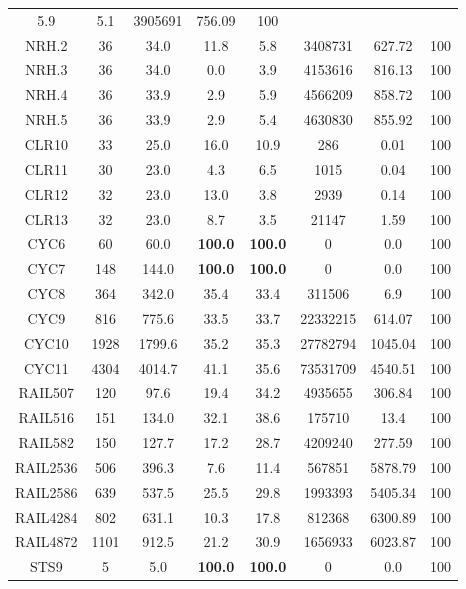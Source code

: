\begin{longtable}{@{\extracolsep{5pt}}cccccccc}
			5.9
		&
			5.1
		& 3905691 & 756.09 & 100
	\\
	NRH.2 &
		36 & 34.0 &
			11.8
		&
			5.8
		& 3408731 & 627.72 & 100
	\\
	NRH.3 &
		36 & 34.0 &
			0.0
		&
			3.9
		& 4153616 & 816.13 & 100
	\\
	NRH.4 &
		36 & 33.9 &
			2.9
		&
			5.9
		& 4566209 & 858.72 & 100
	\\
	NRH.5 &
		36 & 33.9 &
			2.9
		&
			5.4
		& 4630830 & 855.92 & 100
	\\
	CLR10 &
		33 & 25.0 &
			16.0
		&
			10.9
		& 286 & 0.01 & 100
	\\
	CLR11 &
		30 & 23.0 &
			4.3
		&
			6.5
		& 1015 & 0.04 & 100
	\\
	CLR12 &
		32 & 23.0 &
			13.0
		&
			3.8
		& 2939 & 0.14 & 100
	\\
	CLR13 &
		32 & 23.0 &
			8.7
		&
			3.5
		& 21147 & 1.59 & 100
	\\
	CYC6 &
		60 & 60.0 &
			\textbf{100.0}
		&
			\textbf{100.0}
		& 0 & 0.0 & 100
	\\
	CYC7 &
		148 & 144.0 &
			\textbf{100.0}
		&
			\textbf{100.0}
		& 0 & 0.0 & 100
	\\
	CYC8 &
		364 & 342.0 &
			35.4
		&
			33.4
		& 311506 & 6.9 & 100
	\\
	CYC9 &
		816 & 775.6 &
			33.5
		&
			33.7
		& 22332215 & 614.07 & 100
	\\
	CYC10 &
		1928 & 1799.6 &
			35.2
		&
			35.3
		& 27782794 & 1045.04 & 100
	\\
	CYC11 &
		4304 & 4014.7 &
			41.1
		&
			35.6
		& 73531709 & 4540.51 & 100
	\\
	RAIL507 &
		120 & 97.6 &
			19.4
		&
			34.2
		& 4935655 & 306.84 & 100
	\\
	RAIL516 &
		151 & 134.0 &
			32.1
		&
			38.6
		& 175710 & 13.4 & 100
	\\
	RAIL582 &
		150 & 127.7 &
			17.2
		&
			28.7
		& 4209240 & 277.59 & 100
	\\
	RAIL2536 &
		506 & 396.3 &
			7.6
		&
			11.4
		& 567851 & 5878.79 & 100
	\\
	RAIL2586 &
		639 & 537.5 &
			25.5
		&
			29.8
		& 1993393 & 5405.34 & 100
	\\
	RAIL4284 &
		802 & 631.1 &
			10.3
		&
			17.8
		& 812368 & 6300.89 & 100
	\\
	RAIL4872 &
		1101 & 912.5 &
			21.2
		&
			30.9
		& 1656933 & 6023.87 & 100
	\\
	STS9 &
		5 & 5.0 &
			\textbf{100.0}
		&
			\textbf{100.0}
		& 0 & 0.0 & 100
	\\

\end{longtable}
